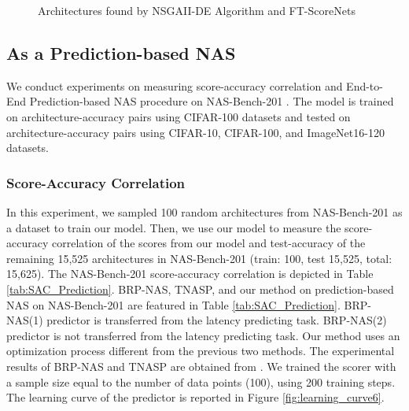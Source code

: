 \documentclass[lettersize,journal]{IEEEtran}
\begin{document}
        \begin{figure*}
            \centering
            
            


            \vspace{1mm} \caption{Architectures found by NSGAII-DE Algorithm and FT-ScoreNets}
            \label{fig:search}
        \end{figure*}
            

    \subsection{As a Prediction-based NAS}
        We conduct experiments on measuring score-accuracy correlation and End-to-End Prediction-based NAS procedure on NAS-Bench-201 \cite{nb201}. The model is trained on architecture-accuracy pairs using CIFAR-100 datasets and tested on architecture-accuracy pairs using CIFAR-10, CIFAR-100, and ImageNet16-120 datasets.
        \subsubsection{Score-Accuracy Correlation}
            In this experiment, we sampled 100 random architectures from NAS-Bench-201 as a dataset to train our model. Then, we use our model to measure the score-accuracy correlation of the scores from our model and test-accuracy of the remaining 15,525 architectures in NAS-Bench-201 (train: 100, test 15,525, total: 15,625). The NAS-Bench-201 score-accuracy correlation is depicted in Table \ref{tab:SAC_Prediction}. BRP-NAS, TNASP, and our method on prediction-based NAS on NAS-Bench-201 are featured in Table \ref{tab:SAC_Prediction}. BRP-NAS(1) predictor is transferred from the latency predicting task. BRP-NAS(2) predictor is not transferred from the latency predicting task. Our method uses an optimization process different from the previous two methods. The experimental results of BRP-NAS and TNASP are obtained from \cite{TNASP, BRP-NAS}. We trained the scorer with a sample size equal to the number of data points (100), using 200 training steps. The learning curve of the predictor is reported in Figure \ref{fig:learning_curve6}.
\end{document}
